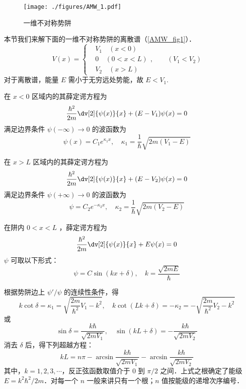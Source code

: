 
\begin{issues}
\issueTODO
{}
\end{issues}

\begin{figure}[ht]
\centering
\texttt{[image: ./figures/AMW\_1.pdf]}
\caption{一维不对称势阱} \label{AMW_fig1}
\end{figure}
本节我们来解下面的一维不对称势阱的离散谱（\autoref{AMW_fig1}）．
\begin{equation}
V(x)=\left\{\begin{aligned}
&V_1\quad(x<0)\\
&0\quad (0<x<L)\\
&V_2\quad(x>L)
\end{aligned}\right.
,\qquad (V_1 < V_2)
\end{equation}
对于离散谱，能量 $E$ 需小于无穷远处势能，故 $E<V_1$. 

在 $x<0$ 区域内的其薛定谔方程为
\begin{equation}
\frac{\hbar^2}{2m}\dv[2]{\psi(x)}{x}+(E-V_1)\psi(x)=0
\end{equation}
满足边界条件 $\psi(-\infty)\to 0$ 的波函数为
\begin{equation}
\psi(x)=C_1 e^{\kappa_1 x},\quad \kappa_1=\frac{1}{\hbar}\sqrt{2m(V_1-E)}
\end{equation}

在 $x>L$ 区域内的其薛定谔方程为
\begin{equation}
\frac{\hbar^2}{2m}\dv[2]{\psi(x)}{x}+(E-V_2)\psi(x)=0
\end{equation}
满足边界条件 $\psi(+\infty)\to 0$ 的波函数为
\begin{equation}
\psi=C_2 e^{-\kappa_2 x},\quad \kappa_2=\frac{1}{\hbar}\sqrt{2m(V_2-E)}
\end{equation}

在阱内 $0 < x < L$ ，薛定谔方程为
\begin{equation}
\frac{\hbar^2}{2m}\dv[2]{\psi(x)}{x}+E\psi(x)=0
\end{equation}
$\psi$ 可取以下形式：
\begin{equation}
\psi=C\sin(kx+\delta),\quad k=\frac{\sqrt{2mE}}{\hbar}
\end{equation}

根据势阱边上 $\psi'/\psi$ 的连续性条件，得
\begin{equation}
k\cot\delta=\kappa_1=\sqrt{\frac{2m}{\hbar^2}V_1-k^2},\quad k\cot(Lk+\delta)=-\kappa_2=-\sqrt{\frac{2m}{\hbar^2}V_2-k^2}
\end{equation}
或
\begin{equation}
\sin\delta=\frac{k\hbar}{\sqrt{2mV_1}},\quad\sin(kL+\delta)=-\frac{k\hbar}{\sqrt{2mV_2}}
\end{equation}
消去 $\delta$ 后，得下列超越方程：
\begin{equation}\label{AMW_eq1}
kL=n\pi-\arcsin\frac{k\hbar}{\sqrt{2mV_1}}-\arcsin\frac{k\hbar}{\sqrt{2mV_2}}
\end{equation}
其中，$k=1,2,3,\cdots$，反正弦函数取值介于 $0$ 到 $\pi/2$ 之间．上式之根确定了能级 $E=k^2\hbar^2/2m$．对每一个 $n$ 一般来讲只有一个根；$n$ 值按能级的递增次序编号．

